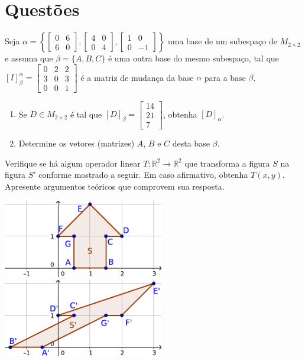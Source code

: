 \documentclass[12pt,a4paper]{article}
\newcommand{\fixme}{{\color{red}(...)}}
\newcommand*\R{\mathbb{R}}
\begin{document}
\section*{Questões}
\begin{ExerciseList}
\Exercise[title={2,5}] Seja $\alpha = \left\{
\begin{bmatrix}
0 & 6 \\ 6 & 0
\end{bmatrix},
\begin{bmatrix}
4 & 0 \\ 0 & 4
\end{bmatrix},
\begin{bmatrix}
1 & 0 \\ 0 & -1
\end{bmatrix}
\right\}$ uma base de um subespaço de $M_{2 \times 2}$ e assuma que $\beta = \{A, B, C\}$ é uma outra base do mesmo subespaço, tal que $[I]^\alpha_\beta = \begin{bmatrix}
0 & 2 & 2 \\ 3 & 0 & 3 \\ 0 & 0 & 1
\end{bmatrix}$ é a matriz de mudança da base $\alpha$ para a base $\beta$.
\begin{enumerate}
\item Se $D \in M_{2 \times 2}$ é tal que $[D]_\beta = \begin{bmatrix}
14 \\ 21 \\ 7
\end{bmatrix}$, obtenha $[D]_\alpha$.
\item Determine os vetores (matrizes) $A$, $B$ e $C$ desta base $\beta$.
\end{enumerate}
\Answer \fixme

\Exercise[title={2,5}] Verifique se há algum operador linear $T:\R^2 \to \R^2$ que transforma a figura $S$ na figura $S'$ conforme mostrado a seguir. Em caso afirmativo, obtenha $T(x,y)$. Apresente argumentos teóricos que comprovem sua resposta.
\begin{center}
\includegraphics[width=7.0cm]{img/prova-3-pro-plano-1}
\hspace{1cm}
\includegraphics[width=7.0cm]{img/prova-3-pro-plano-2}
\end{center}
\Answer \fixme


\end{ExerciseList}
\end{document}
